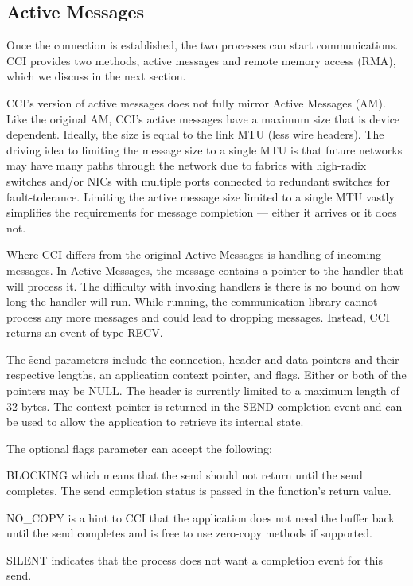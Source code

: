 \documentclass[conference]{IEEEtran}
\begin{document}
\subsection{Active Messages}
Once the connection is established, the two processes can start communications. CCI
provides two methods, active messages and remote memory access (RMA), which we discuss in
the next section.

CCI's version of active messages does not fully mirror Active Messages\cite{am} (AM). Like
the original AM, CCI's active messages have a maximum size that is device dependent.
Ideally, the size is equal to the link MTU (less wire headers). The driving idea to
limiting the message size to a single MTU is that future networks may have many paths
through the network due to fabrics with high-radix switches and/or NICs with multiple
ports connected to redundant switches for fault-tolerance.  Limiting the active message
size limited to a single MTU vastly simplifies the requirements for message completion ---
either it arrives or it does not.

Where CCI differs from the original Active Messages is handling of incoming messages.  In
Active Messages, the message contains a pointer to the handler that will process it.  The
difficulty with invoking handlers is there is no bound on how long the handler will run.
While running, the communication library cannot process any more messages and could lead
to dropping messages. Instead, CCI returns an event of type RECV.

The \f{send} parameters include the connection, header and data pointers and their
respective lengths, an application context pointer, and flags. Either or both of the
pointers may be NULL. The header is currently limited to a maximum length of 32 bytes. The
context pointer is returned in the SEND completion event and can be used to allow the
application to retrieve its internal state.

The optional flags parameter can accept the following:

\begin{description}
\item BLOCKING which means that the send should not return until the send
completes. The send completion status is passed in the function's return value.
\item NO\_COPY is a hint to CCI that the application does not need the buffer
back until the send completes and is free to use zero-copy methods if supported.
\item SILENT indicates that the process does not want a completion event for this
send.
\end{description}
\end{document}
